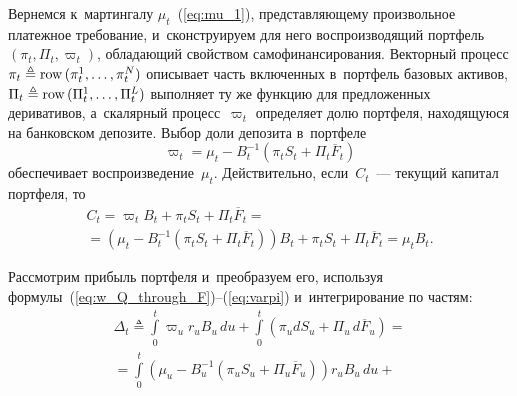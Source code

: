 \begin{multicols}{2}
Вернемся к~мартингалу $\mu_t$~(\ref{eq:mu_1}),
представляющему произвольное платежное требование, и~сконструируем для него воспроизводящий портфель 
$(\pi_t,\Pi_t, \varpi_t)$, обладающий свойством самофинансирования. Векторный процесс $\pi_t 
\triangleq \mathop{\mathrm{row\,}} (\pi_t^1, \ldots, \pi_t^N)$ описывает часть включенных в~портфель базовых активов, $\Pi_t 
\triangleq \mathop{\mathrm{row\,}} (\Pi_t^1, \ldots, \Pi_t^L)$ выполняет ту же функцию для предложенных деривативов, 
а~скалярный процесс~$\varpi_t$ определяет долю портфеля, находящуюся на банковском депозите. Выбор доли депозита в~портфеле
\begin{equation}
\varpi_t = \mu_t - B_t^{-1}(\pi_tS_t+\Pi_t\overline{F}_t)
\label{eq:varpi}
\end{equation}
обеспечивает воспроизведение~$\mu_t$. Действительно, если~$C_t$~--- текущий капитал портфеля, то
\begin{multline*}
C_t = \varpi_t B_t +  \pi_tS_t+\Pi_t\overline{F}_t ={}\\
{}= \left( \mu_t \!-\! B_t^{-1}(\pi_tS_t\! +\!\Pi_t\overline{F}_t)\right) B_t
\!+\!  \pi_tS_t \!+\!\Pi_t\overline{F}_t\! =\!  \mu_t  B_t.
\end{multline*}

Рассмотрим прибыль портфеля и~преобразуем его, используя формулы~(\ref{eq:w_Q_through_F})--(\ref{eq:varpi}) и~интегрирование по частям:
\begin{multline*}
\Delta_t  \triangleq \int\limits_0^t \varpi_u r_u B_u\, du + \int\limits_0^t \left( \pi_u dS_u + \Pi_u \,d \overline{F}_u \right) = {}\\
{} =
\int\limits_0^t \left( \mu_u - B_u^{-1}(\pi_uS_u+\Pi_u\overline{F}_u) \right) r_u B_u \,du +{}
\end{multline*}


\end{multicols}
